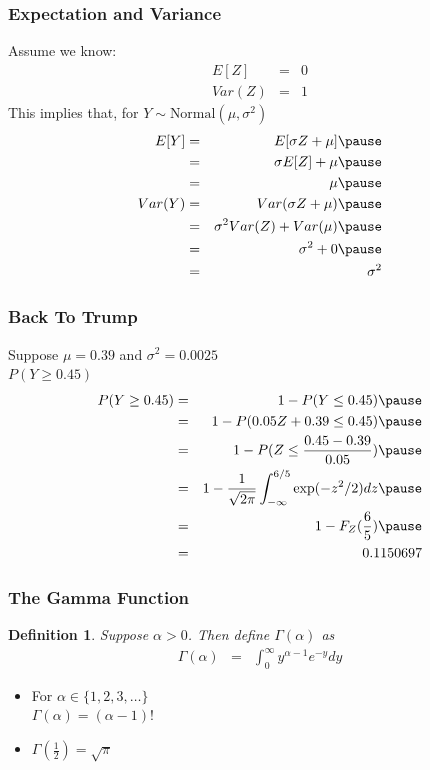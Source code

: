 \documentclass[handout]{beamer}
\newtheorem{defn}{Definition}
\numberwithin{equation}{section}
\begin{document}
\begin{frame}
\frametitle{Expectation and Variance}

Assume we know:
\begin{eqnarray}
E[Z]  & = & 0 \nonumber \\
Var(Z) & = & 1 \nonumber 
\end{eqnarray}
\pause 
This implies that, for $Y \sim \text{Normal}(\mu, \sigma^2)$ \pause 
\begin{eqnarray} 
E[Y] & = & E[\sigma Z + \mu] \nonumber  \pause \\
& = & \sigma E[Z] + \mu \nonumber  \pause \\
& = & \mu \nonumber \pause \\
Var(Y) & = & Var(\sigma Z + \mu) \nonumber \pause \\
& = & \sigma^2 Var(Z) + Var(\mu) \nonumber  \pause \\
& = & \sigma^2 + 0 \nonumber \pause \\
 & =& \sigma^2 \nonumber 
\end{eqnarray}

\end{frame}





\begin{frame}
\frametitle{Back To Trump} 

Suppose $\mu = 0.39$ and $\sigma^2 = 0.0025$ \pause  \\
$P(Y\geq 0.45)$  \pause 
\begin{eqnarray} 
P(Y \geq 0.45)  &  = & 1 - P(Y \leq 0.45 ) \nonumber \pause  \\
& = &  1 - P(0.05 Z + 0.39 \leq  0.45)   \nonumber  \pause\\
& = & 1 - P(Z \leq \frac{0.45-0.39 }{0.05} ) \nonumber \pause \\
& = & 1 - \frac{1}{\sqrt{2\pi} } \int_{-\infty}^{6/5} \exp(-z^2/2) dz \pause   \nonumber \\
& = & 1 - F_{Z} (\frac{6}{5} ) \nonumber \pause\\
& = & 0.1150697 \nonumber 
\end{eqnarray}
\end{frame}

\begin{frame}
\frametitle{The Gamma Function}

\begin{defn}
Suppose $\alpha>0$.  Then define $\Gamma(\alpha)$ as 
\begin{eqnarray}
\Gamma(\alpha) & = & \int_{0}^{\infty} y^{\alpha- 1} e^{-y} dy \nonumber 
\end{eqnarray}
\end{defn}

\begin{itemize}
\item[-] For $\alpha \in \{1, 2, 3, \hdots\}$\\
 $\Gamma(\alpha) = (\alpha- 1)!$
\item[-] $\Gamma(\frac{1}{2}) = \sqrt{\pi}$
\end{itemize}


\end{frame}
\end{document}
